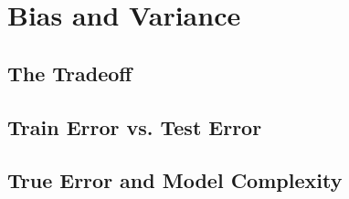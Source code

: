 \section{Bias and Variance}

\subsection{The Tradeoff}

\subsection{Train Error vs. Test Error}

\subsection{True Error and Model Complexity}


